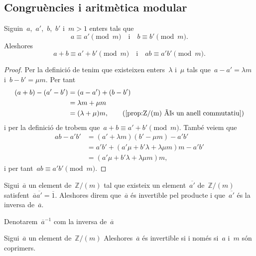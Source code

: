 \documentclass[../../main.tex]{subfiles}
\begin{document}
    \subsection{Congruències i aritmètica modular}
    \begin{proposition}
        Siguin~\(a\),~\(a'\),~\(b\),~\(b'\) i~\(m>1\) enters tals que
        \[
            a\equiv a'\pmod{m}\quad\text{i}\quad b\equiv b'\pmod{m}.
        \]
        Aleshores
        \[
            a+b\equiv a'+b'\pmod{m}\quad\text{i}\quad ab\equiv a'b'\pmod{m}.
        \]
    \end{proposition}
    \begin{proof}
        Per la definició de  tenim que existeixen enters~\(\lambda\) i~\(\mu\) tals que~\(a-a'=\lambda m\) i~\(b-b'=\mu m\).
        Per tant
        \begin{align*}
        (a+b)-(a'-b')&=(a-a')+(b-b')\\
        &=\lambda m+\mu m\\
        &=(\lambda+\mu)m,\tag{\ref{prop:Z/(m) és un anell commutatiu}}
        \end{align*}
        i per la definició de  trobem que~\(a+b\equiv a'+b'\pmod{m}\).
        També veiem que
        \begin{align*}
        ab-a'b'&=(a'+\lambda m)(b'-\mu m)-a'b'\\
        &=a'b'+(a'\mu+b'\lambda+\lambda\mu m)m-a'b'\\
        &=(a'\mu+b'\lambda+\lambda\mu m)m,
        \end{align*}
        i per tant~\(ab\equiv a'b'\pmod{m}\).
    \end{proof}
    \begin{definition}
        \label{def:nombre modular invertible}
        Sigui~\(\overline{a}\) un element de~\(\mathbb{Z}/(m)\) tal que existeix un element~\(\overline{a'}\) de~\(\mathbb{Z}/(m)\) satisfent~\(\overline{a}\overline{a'}=\overline{1}\).
        Aleshores direm que~\(\overline{a}\) és invertible pel producte i que~\(\overline{a'}\) és la inversa de~\(\overline{a}\).

        Denotarem~\(\overline{a}^{-1}\) com la inversa de~\(\overline{a}\)
    \end{definition}
    \begin{proposition}
        \label{prop:condició equivalent a invertible en Z/(m)}
        Sigui~\(\overline{a}\) un element de~\(\mathbb{Z}/(m)\) Aleshores~\(\overline{a}\) és invertible si i només si~\(a\) i~\(m\) són coprimers.
    \end{proposition}
\end{document}
